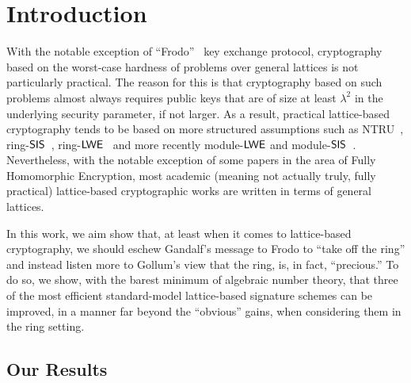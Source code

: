 \section{Introduction}
\label{sec:intro}
With the notable exception of ``Frodo''~\cite{DBLP:conf/ccs/BosCDMNNRS16} key exchange protocol, cryptography based on the worst-case hardness of problems over general lattices is not particularly practical. The reason for this is that cryptography based on such problems almost always requires public keys that are of size at least $\lambda^2$ in the underlying security parameter, if not larger. As a result, practical lattice-based cryptography tends to be based on more structured assumptions such as NTRU~\cite{DBLP:conf/ants/HoffsteinPS98}, ring-$\mathsf{SIS}$~\cite{DBLP:conf/tcc/PeikertR06,DBLP:conf/icalp/LyubashevskyM06}, ring-$\mathsf{LWE}$~\cite{DBLP:conf/eurocrypt/LyubashevskyPR10} and more recently module-$\mathsf{LWE}$ and module-$\mathsf{SIS}$~\cite{DBLP:journals/dcc/LangloisS15}. Nevertheless, with the notable exception of some papers in the area of Fully Homomorphic Encryption, most academic (meaning not actually truly, fully practical) lattice-based cryptographic works are written in terms of general lattices. 

In this work, we aim show that, at least when it comes to lattice-based cryptography, we should eschew Gandalf's message to Frodo to ``take off the ring'' and instead listen more to Gollum's view that the ring, is, in fact, ``precious.'' To do so, we show, with the barest minimum of algebraic number theory, that three of the most efficient standard-model lattice-based signature schemes can be improved, in a manner far beyond the ``obvious'' gains, when considering them in the ring setting. 



\subsection{Our Results}
\label{sec:an-improved-boyen}


